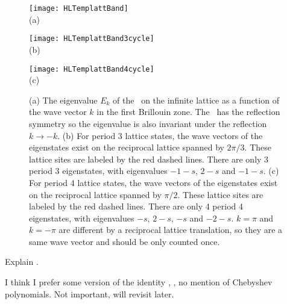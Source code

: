 \begin{figure}\begin{center}
            \begin{minipage}[c]{0.3\textwidth}\begin{center}
\texttt{[image: HLTemplattBand]}\\(a)
            \end{center}\end{minipage}
            \begin{minipage}[c]{0.3\textwidth}\begin{center}
\texttt{[image: HLTemplattBand3cycle]}\\(b)
            \end{center}\end{minipage}
            \begin{minipage}[c]{0.3\textwidth}\begin{center}
\texttt{[image: HLTemplattBand4cycle]}\\(c)
            \end{center}\end{minipage}
\end{center}
  \caption{\label{fig:LC21emplattBand}
(a) The eigenvalue $E_k$ of the \jacobianOrb\ on the infinite lattice as a function of the wave
vector $k$ in the first Brillouin zone. The \jacobianOrb\ has the reflection symmetry so the
eigenvalue is also invariant under the reflection $k\to -k$.
(b) For period 3 lattice states, the wave vectors of the eigenstates exist on the reciprocal lattice
spanned by $2\pi/3$. These lattice sites are labeled by the red dashed lines. There are only
3 period 3 eigenstates, with eigenvalues $-1-s$, $2-s$ and $-1-s$.
(c) For period 4 lattice states, the wave vectors of the eigenstates exist on the reciprocal lattice
spanned by $\pi/2$. These lattice sites are labeled by the red dashed lines. There are only
4 period 4 eigenstates, with eigenvalues $-s$, $2-s$, $-s$ and $-2-s$.
$k=\pi$ and $k=-\pi$ are different by a reciprocal lattice translation, so they are a same
wave vector and should be only counted once.
          }
\end{figure}

Explain .

         {
I think I prefer some version of the identity ,
,
no mention of Chebyshev polynomials. Not important, will revisit later.
    }



